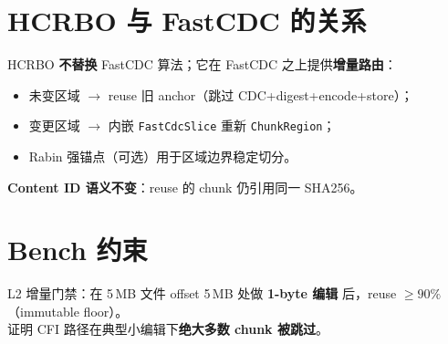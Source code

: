 \section{HCRBO 与 FastCDC 的关系}

\begin{corebox}[分层不替代]
HCRBO \textbf{不替换} FastCDC 算法；它在 FastCDC 之上提供\textbf{增量路由}：
\begin{itemize}[nosep]
  \item 未变区域 $\rightarrow$ reuse 旧 anchor（跳过 CDC+digest+encode+store）；
  \item 变更区域 $\rightarrow$ 内嵌 \texttt{FastCdcSlice} 重新 \texttt{ChunkRegion}；
  \item Rabin 强锚点（可选）用于区域边界稳定切分。
\end{itemize}
\textbf{Content ID 语义不变}：reuse 的 chunk 仍引用同一 SHA256。
\end{corebox}

\section{Bench 约束}

L2 增量门禁：在 5\,MB 文件 offset 5\,MB 处做 \textbf{1-byte 编辑} 后，reuse $\geq 90\%$（immutable floor）。\\
证明 CFI 路径在典型小编辑下\textbf{绝大多数 chunk 被跳过}。
